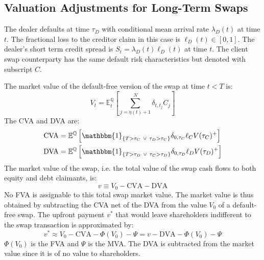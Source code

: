 \documentclass[10pt,a4paper]{article}
\begin{document}
        \subsection{Valuation Adjustments for Long-Term Swaps}
            The dealer defaults at time $\tau_{D}$ with conditional mean arrival rate $\lambda_{D}(t)$ at time $t$. The fractional loss to the creditor claim in this case is $\ell_{D}(t) \in [0, 1]$. The dealer's short term credit spread is $S_{t} = \lambda_{D}(t)\ell_{D}(t)$ at time $t$. The client swap counterparty has the same default risk characteristics but denoted with subscript $C$.

            The market value of the default-free version of the swap at time $t<T$ is:
                \begin{equation}
                    V_{t} = \mathbb{E}_{t}^{\mathbb{Q}}\left[\sum_{j=\eta(t)+1}^{N} \delta_{t,t_{j}}C_{j}\right] 
                \end{equation}
            The CVA and DVA are:
                \begin{align}
                    \text{CVA} &= \mathbb{E}^{\mathbb{Q}}\left[
                        \mathbbm{1}_{\{T > \tau_{C} ~\vee~ \tau_{D} > \tau_{C}\}} \delta_{0,\tau_{C}} \ell_{C} V(\tau_{C})^{+}
                    \right]  \\
                    \text{DVA} &= \mathbb{E}^{\mathbb{Q}}\left[
                        \mathbbm{1}_{\{T > \tau_{D} ~\vee~ \tau_{C} > \tau_{D}\}} \delta_{0,\tau_{D}} \ell_{D} V(\tau_{D})^{+}
                    \right] 
                \end{align}
            The market value of the swap, i.e. the total value of the swap cash flows to both equity and debt claimants, is:
                \begin{equation}
                    v \equiv V_{0} - \text{CVA} - \text{DVA}
                \end{equation}
            No FVA is assignable to this total swap market value. The market value is thus obtained by subtracting the CVA net of the DVA from the value $V_{0}$ of a default-free swap. The upfront payment $v^{\ast}$ that would leave shareholders indifferent to the swap transaction is approximated by:
                \begin{equation}
                    v^{\ast} \approx V_{0} - \text{CVA} - \Phi(V_{0}) - \Psi = v - \text{DVA} - \Phi(V_{0}) - \Psi
                \end{equation}
            $\Phi(V_{0})$ is the FVA and $\Psi$ is the MVA. The DVA is subtracted from the market value since it is of no value to shareholders. 
        
\end{document}
